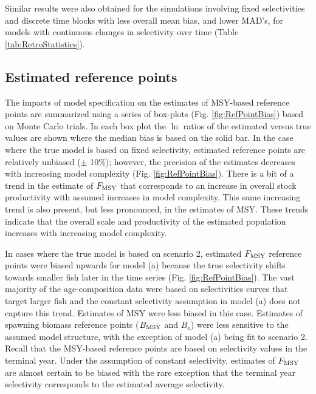 \documentclass[review,letterpaper,10pt,authoryear]{elsarticle}
\begin{document}
Similar results were also obtained for the simulations involving fixed selectivities and discrete time blocks with less overall mean bias, and lower MAD's, for models with continuous changes in selectivity over time (Table \ref{tab:RetroStatistics}).




\subsection*{Estimated reference points} %
\label{sub:estimated_reference_points}


The impacts of model specification on the estimates of MSY-based reference points are summarized using a series of box-plots (Fig. \ref{fig:RefPointBias}) based on Monte Carlo trials.  In each box plot the $\ln$ ratios of the estimated versus true values are shown where the median bias is based on the solid bar.  In the case where the true model is based on fixed selectivity, estimated reference points are relatively unbiased ($\pm$ 10\%); however, the precision of the estimates decreases with increasing model complexity (Fig. \ref{fig:RefPointBias}).  There is a bit of a trend in the estimate of $F_{\rm{MSY}}$ that corresponds to an increase in overall stock productivity with assumed increases in model complexity.  This same increasing trend is also present, but less pronounced, in the estimates of MSY.  These trends indicate that the overall scale and productivity of the estimated population increases with increasing model complexity. 

In cases where the true model is based on scenario 2, estimated $F_{\rm{MSY}}$ reference points were biased upwards for model (a)  because the true selectivity shifts towards smaller fish later in the time series (Fig. \ref{fig:RefPointBias}). The vast majority of the age-composition data were based on selectivities curves that target larger fish and the constant selectivity assumption in model (a) does not capture this trend. Estimates of MSY were less biased in this case. Estimates of spawning biomass reference points ($B_{\rm{MSY}}$ and $B_o$) were less sensitive to the assumed model structure, with the exception of model (a) being fit to scenario 2. Recall that the MSY-based reference points are based on selectivity values in the terminal year. Under the assumption of constant selectivity, estimates of $F_{\rm{MSY}}$ are almost certain to be biased with the rare exception that the terminal year selectivity corresponds to the estimated average selectivity.  
\end{document}
